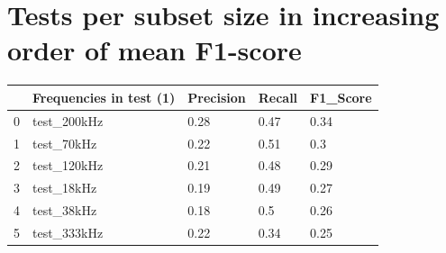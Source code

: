 \section{Tests per subset size in increasing order of mean F1-score} \label{test_per_freq_f1_appendix}

\begin{longtable}{lllll}
\hline
\multicolumn{1}{|l|}{} & \multicolumn{1}{l|}{Frequencies in test (1)} & \multicolumn{1}{l|}{Precision} & \multicolumn{1}{l|}{Recall} & \multicolumn{1}{l|}{F1\_Score} \\ \hline
\endfirsthead
%
\endhead
%
\hline
\endfoot
%
\endlastfoot
%
0                      & test\_200kHz                                & 0.28                           & 0.47                        & 0.34                           \\
1                      & test\_70kHz                                 & 0.22                           & 0.51                        & 0.3                            \\
2                      & test\_120kHz                                & 0.21                           & 0.48                        & 0.29                           \\
3                      & test\_18kHz                                 & 0.19                           & 0.49                        & 0.27                           \\
4                      & test\_38kHz                                 & 0.18                           & 0.5                         & 0.26                           \\
5                      & test\_333kHz                                & 0.22                           & 0.34                        & 0.25                           \\ \hline
\end{longtable}
